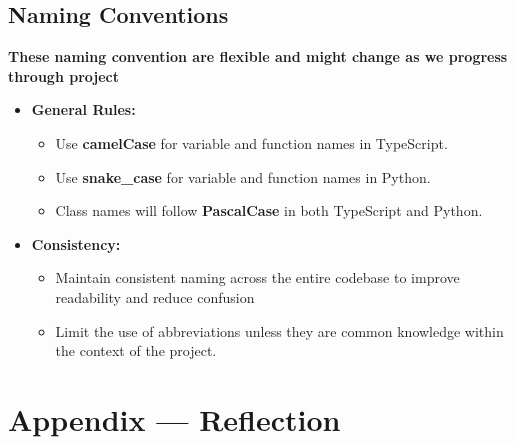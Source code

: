 \documentclass{article}
\begin{document}
\subsection{Naming Conventions}
\textbf{These naming convention are flexible and might change as we progress through project}
\begin{itemize}
    \item \textbf{General Rules:}
    \begin{itemize}
        \item Use \textbf{camelCase} for variable and function names in TypeScript.
        \item Use \textbf{snake\_case} for variable and function names in Python.
        \item Class names will follow \textbf{PascalCase} in both TypeScript and Python.
    \end{itemize}
    
    \item \textbf{Consistency:}
    \begin{itemize}
        \item Maintain consistent naming across the entire codebase to improve readability and reduce confusion
        \item Limit the use of abbreviations unless they are common knowledge within the context of the project.
    \end{itemize}
\end{itemize}

\newpage{}

\newpage{}

\section*{Appendix --- Reflection}


\end{document}
